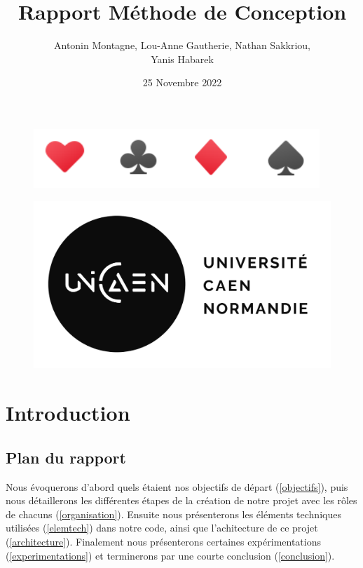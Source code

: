 \documentclass[french,12pt]{article}
\title{Rapport Méthode de Conception}
\author{Antonin Montagne, Lou-Anne Gautherie, Nathan Sakkriou, \\
Yanis Habarek}
\date{25 Novembre 2022}
\begin{document}
\maketitle

\begin{figure}[h]
	\begin{center}
		\includegraphics[scale=0.4]{img/fond.png}	
	\end{center}
\end{figure}

\begin{figure}[b]
	\begin{center}
		\includegraphics[scale=0.7]{img/unicaen.png}	
	\end{center}
\end{figure}

\thispagestyle{empty}
\setcounter{page}{0}
\newpage

\tableofcontents
\newpage

\section{Introduction}

\subsection{Plan du rapport}

Nous évoquerons d'abord quels étaient nos objectifs de départ (\ref{objectifs}), puis nous détaillerons les différentes étapes de la création de notre projet avec les rôles de chacuns (\ref{organisation}). Ensuite nous présenterons les éléments techniques utilisées (\ref{elemtech}) dans notre code, ainsi que l'achitecture de ce projet (\ref{architecture}). Finalement nous présenterons certaines expérimentations (\ref{experimentations}) et terminerons par une courte conclusion (\ref{conclusion}).
\end{document}
